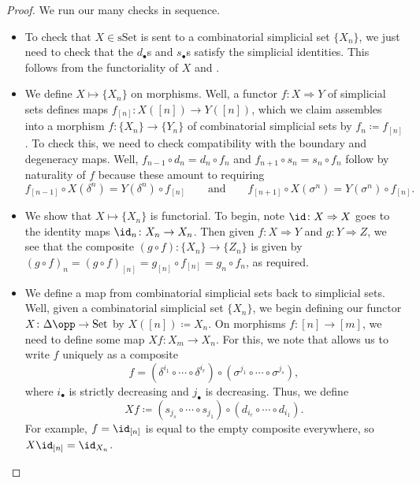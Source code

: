 \documentclass[../notes.tex]{subfiles}
\begin{document}
\begin{proof}
	We run our many checks in sequence.
	\begin{itemize}
		\item To check that $X\in\mathrm{sSet}$ is sent to a combinatorial simplicial set $\{X_n\}$, we just need to check that the $d_\bullet$s and $s_\bullet$s satisfy the simplicial identities. This follows from the functoriality of $X$ and .

		\item We define $X\mapsto\{X_n\}$ on morphisms. Well, a functor $f\colon X\Rightarrow Y$ of simplicial sets defines maps $f_{[n]}\colon X([n])\to Y([n])$, which we claim assembles into a morphism $f\colon\{X_n\}\to\{Y_n\}$ of combinatorial simplicial sets by $f_n\coloneqq f_{[n]}$. To check this, we need to check compatibility with the boundary and degeneracy maps. Well, $f_{n-1}\circ d_n=d_n\circ f_n$ and $f_{n+1}\circ s_n=s_n\circ f_n$ follow by naturality of $f$ because these amount to requiring
		\[f_{[n-1]}\circ X(\delta^n)=Y(\delta^n)\circ f_{[n]}\qquad\text{and}\qquad f_{[n+1]}\circ X(\sigma^n)=Y(\sigma^n)\circ f_{[n]}.\]

		\item We show that $X\mapsto\{X_n\}$ is functorial. To begin, note $\id\colon X\Rightarrow X$ goes to the identity maps $\id_n\colon X_n\to X_n$. Then given $f\colon X\Rightarrow Y$ and $g\colon Y\Rightarrow Z$, we see that the composite $(g\circ f)\colon\{X_n\}\to\{Z_n\}$ is given by $(g\circ f)_n=(g\circ f)_{[n]}= g_{[n]}\circ f_{[n]}=g_n\circ f_n$, as required.

		\item We define a map from combinatorial simplicial sets back to simplicial sets. Well, given a combinatorial simplicial set $\{X_n\}$, we begin defining our functor $X\colon\Delta\opp\to\mathrm{Set}$ by $X([n])\coloneqq X_n$. On morphisms $f\colon[n]\to[m]$, we need to define some map $Xf\colon X_m\to X_n$. For this, we note that  allows us to write $f$ uniquely as a composite
		\[f=(\delta^{i_1}\circ\cdots\circ\delta^{i_r})\circ(\sigma^{j_1}\circ\cdots\circ\sigma^{j_s}),\]
		where $i_\bullet$ is strictly decreasing and $j_\bullet$ is decreasing. Thus, we define
		\[Xf\coloneqq(s_{j_s}\circ\cdots\circ s_{j_1})\circ(d_{i_r}\circ\cdots\circ d_{i_1}).\]
		For example, $f=\id_{[n]}$ is equal to the empty composite everywhere, so $X{\id_{[n]}}=\id_{X_n}$.


\end{itemize}
\end{proof}
\end{document}
